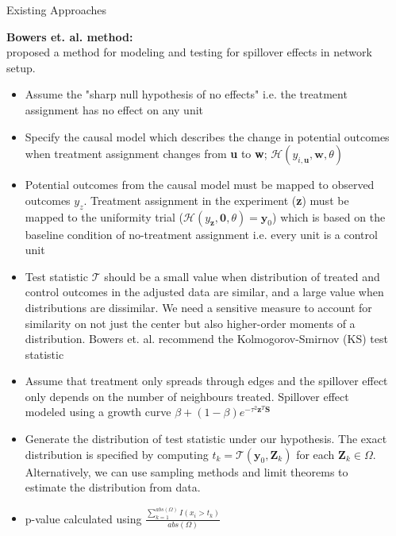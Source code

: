 \documentclass[final]{beamer}
\newlength{\onecolwid}
\newlength{\onecolwidd}
\begin{document}
\begin{frame}[t]
\begin{columns}[t]
\begin{column}{\onecolwidd}
\end{column}		
	\begin{column}{\onecolwidd}
	
	\begin{block}{Existing Approaches}
		\begin{rmfamily}
	
	{\Large \textbf{Bowers et. al. method:}}\\
	\citealt{bowers2012reasoning} proposed a method for modeling and testing for spillover effects in network setup.
	

	\begin{itemize}
	
	\item Assume the "sharp null hypothesis of no effects" i.e. the treatment assignment has no effect on any unit
	\vspace*{.1in}
	\item Specify the causal model which describes the change in potential outcomes when treatment assignment changes from \textbf{u} to \textbf{w}; $\mathcal{H}(y_{i, \textbf{u}}, \textbf{w}, \theta)$
	\vspace*{.1in}
	\item Potential outcomes from the causal model must be mapped to observed outcomes $y_z$. Treatment assignment in the experiment (\textbf{z}) must be mapped to the uniformity trial ($\mathcal{H}(y_{\textbf{z}}, \textbf{0}, \theta) = \textbf{y}_0$) which is based on the baseline condition of no-treatment assignment i.e. every unit is a control unit
	\vspace*{.1in}	
	\item Test statistic $\mathcal{T}$ should be a small value when distribution of treated and control outcomes in the adjusted data are similar, and a large value when distributions are dissimilar. We need a sensitive measure to account for similarity on not just the center but also higher-order moments of a distribution. Bowers et. al. recommend the Kolmogorov-Smirnov (KS) test statistic
	\vspace*{.1in}
	\item Assume that treatment only spreads through edges and the spillover effect only depends on the number of neighbours treated. Spillover effect modeled using a growth curve $\beta + (1-\beta)e^{-\tau^2\textbf{z}^T\textbf{S}}$
	\vspace*{.1in}
	\item Generate the distribution of test statistic under our hypothesis. The exact distribution is specified by computing $t_k = \mathcal{T} (\textbf{y}_0, \textbf{Z}_k)$ for each $\textbf{Z}_k \in \Omega$. Alternatively, we can use sampling methods and limit theorems to estimate the distribution from data.
	\vspace*{.1in}
	\item p-value calculated using $\frac{\sum_{k=1}^{abs(\Omega)} I(x_i  > t_k)}{abs(\Omega)}$
	\vspace*{.1in}	
	\end{itemize}


\end{rmfamily}
\end{block}
\end{column}
\end{columns}
\end{frame}
\end{document}
